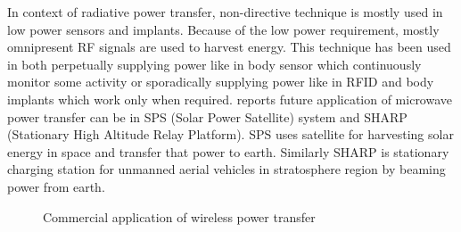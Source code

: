 \documentclass[UKenglish]{ifimaster}  %
\begin{document}
In context of radiative power transfer, non-directive technique is mostly used in low power sensors and implants. 
Because of the low power requirement, mostly omnipresent RF signals are used to harvest energy. This technique 
has been used in both perpetually supplying power like in body sensor which continuously monitor some activity 
or sporadically supplying power like in RFID and body implants which work only when required. \cite{wpt_fund_std} reports 
future application of microwave power transfer can be in SPS (Solar Power Satellite) system and SHARP (Stationary 
High Altitude Relay Platform). SPS uses satellite for harvesting solar energy in space and transfer that power 
to earth. Similarly SHARP is stationary charging station for unmanned aerial vehicles in stratosphere region by 
beaming power from earth.    \\

\begin{figure} [htbp]
  \begin{minipage}{\linewidth}
  \centering 
  \hfill
 \hfill
 \end{minipage}\par\medskip
 \centering
 \caption{Commercial application of wireless power transfer} 
\label{wpt_application} 
\end{figure}
\end{document}
